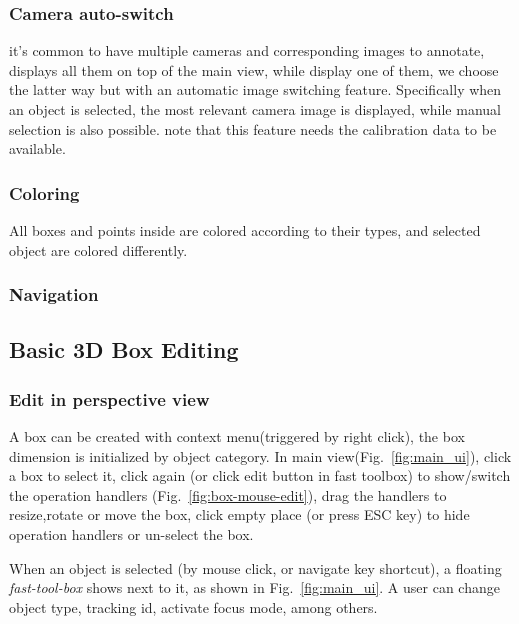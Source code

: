 \documentclass[letterpaper, 10 pt, conference]{ieeeconf}  %
\begin{document}
\subsubsection{Camera auto-switch}
it's common to have multiple cameras and corresponding images to annotate, \cite{Zimmer20193DBA} displays all them on top of the main view, while \cite{} display one of them, we choose the latter way but with an automatic image switching feature. Specifically when an object is selected, the most relevant camera image is displayed, while manual selection is also possible.
note that this feature needs the calibration data to be available.

\subsubsection{Coloring}
All boxes and points inside are colored according to their types, and selected object are colored differently.

\subsubsection{Navigation}
\label{section:navigation}



\subsection{Basic 3D Box Editing}

\subsubsection{Edit in perspective view}
A box can be created with context menu(triggered by right click), the box dimension is initialized by object category. In main view(Fig.~\ref{fig:main_ui}), click a box to select it, click again (or click edit button in fast toolbox) to show/switch the operation handlers (Fig.~\ref{fig:box-mouse-edit}), drag the handlers to resize,rotate or move the box, click empty place (or press ESC key) to hide operation handlers or un-select the box.


When an object is selected (by mouse click, or navigate key shortcut), a floating \emph{fast-tool-box} shows next to it, as shown in Fig.~\ref{fig:main_ui}. A user can change object type, tracking id, activate focus mode, among others.
\end{document}
